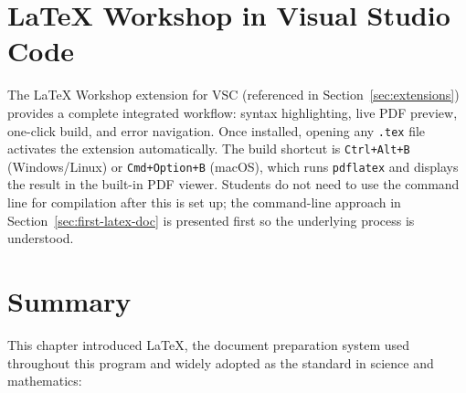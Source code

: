 \section{LaTeX Workshop in Visual Studio Code}
\label{sec:latex-workshop}

The LaTeX Workshop extension for VSC (referenced in
Section~\ref{sec:extensions}) provides a complete integrated workflow:
syntax highlighting, live PDF preview, one-click build, and error
navigation. Once installed, opening any \texttt{.tex} file activates
the extension automatically. The build shortcut is
\texttt{Ctrl+Alt+B} (Windows/Linux) or \texttt{Cmd+Option+B}
(macOS), which runs \texttt{pdflatex} and displays the result in the
built-in PDF viewer. Students do not need to use the command line for
compilation after this is set up; the command-line approach in
Section~\ref{sec:first-latex-doc} is presented first so the
underlying process is understood.

\section{Summary}
\label{sec:latex-summary}

This chapter introduced \LaTeX{}, the document preparation system
used throughout this program and widely adopted as the standard in
science and mathematics:


